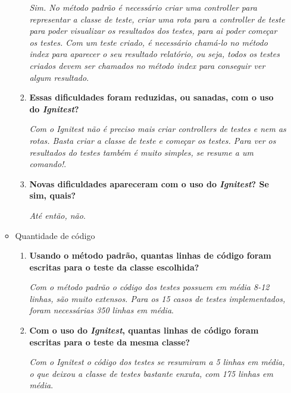 \begin{itemize}
\begin{itemize}
\begin{enumerate}
			  \subitem \textit{Sim. No método padrão é necessário criar uma controller para representar a classe de teste,
				    criar uma rota para a controller de teste para poder visualizar os resultados dos testes, para ai
				    poder começar os testes. Com um teste criado, é necessário chamá-lo no método index para aparecer
				    o seu resultado relatório, ou seja, todos os testes criados devem ser chamados no método index para
				    conseguir ver algum resultado}.
			  
                        \item \textbf{Essas dificuldades foram reduzidas, ou sanadas, com o uso do \textit{Ignitest}?}
                        
			  \subitem \textit{Com o Ignitest não é preciso mais criar controllers de testes e nem as rotas. Basta criar 
				    a classe de teste e começar os testes. Para ver os resultados do testes também é muito simples, 
				    se resume a um comando!}.
			  
                        \item \textbf{Novas dificuldades apareceram com o uso do \textit{Ignitest}? Se sim, quais?}
                        
			  \subitem \textit{Até então, não}.
			  
                    \end{enumerate}
                \item Quantidade de código
                    \begin{enumerate}
                        \item \textbf{Usando o método padrão, quantas linhas de código foram escritas para o teste da classe escolhida?}
			  
			  \subitem \textit{Com o método padrão o código dos testes possuem em média 8-12 linhas, são muito extensos.
				    Para os 15 casos de testes implementados, foram necessárias 350 linhas em média}.
			  
                        \item \textbf{Com o uso do \textit{Ignitest}, quantas linhas de código foram escritas para o teste da mesma classe?}
			  
			  \subitem \textit{Com o Ignitest o código dos testes se resumiram a 5 linhas em média, o que deixou a classe
				    de testes bastante enxuta, com 175 linhas em média}.
			  
                    \end{enumerate}


\end{itemize}
\end{itemize}
